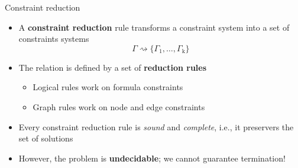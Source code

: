 \documentclass[11pt,aspectratio=169]{beamer}
\begin{document}
\begin{frame}[fragile]{Constraint reduction}
    \begin{itemize}
        \item A \textbf{constraint reduction} rule transforms a constraint 
              system into a set of constraints systems
        \begin{equation*}
            \Gamma \rightsquigarrow \{\Gamma_1, \dots, \Gamma_{\mathrm{k}}\}
        \end{equation*}
        \vspace*{-.5cm}
        \item The relation is defined by a set of \textbf{reduction rules}
        \begin{itemize}
            \item Logical rules work on formula constraints
            \item Graph rules work on node and edge constraints
        \end{itemize}
        \item Every constraint reduction rule is \textit{sound} and
              \textit{complete}, i.e., it preservers the set of solutions
        \item However, the problem is \textbf{undecidable}; we cannot guarantee 
              termination!
    \end{itemize}
\end{frame}
\end{document}
